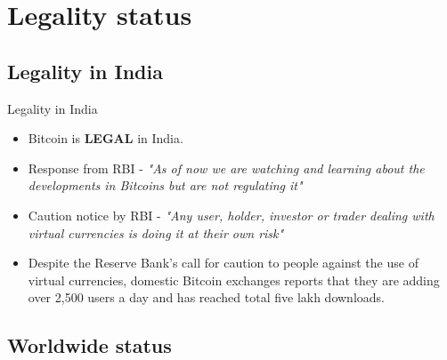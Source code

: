 \documentclass[handout]{beamer}
\begin{document}
\section{Legality status}
\subsection{Legality in India}
\begin{frame}{Legality in India}{}

  \begin{itemize}       
\item Bitcoin is \textbf{LEGAL} in India.

 \item Response from RBI - \textit{"As of now we are watching and learning about the developments in Bitcoins but are not regulating it"}

 \item Caution notice by RBI - \textit{"Any user, holder, investor or trader dealing with virtual currencies is doing it at their own risk"}
 
 \item Despite the Reserve Bank's call for caution to people against the use of virtual currencies, domestic Bitcoin exchanges reports that they are adding over 2,500 users a day and has reached total five lakh downloads.

    
  \end{itemize}
\end{frame}


\subsection{Worldwide status}
\end{document}
